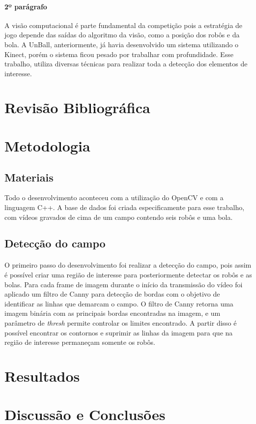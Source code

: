 \documentclass[conference, harvard, brazil, english]{sbatex}
\begin{document}
		\paragraph{2º parágrafo}
		A visão computacional é parte fundamental da competição pois a estratégia de jogo depende das saídas do algoritmo da visão, como a posição dos robôs e da bola. A UnBall, anteriormente, já havia desenvolvido um sistema utilizando o Kinect, porém o sistema ficou pesado por trabalhar com profundidade. Esse trabalho, utiliza diversas técnicas para realizar toda a detecção dos elementos de interesse.
		
	\section{Revisão Bibliográfica}
	
	\section{Metodologia}
		\subsection{Materiais}
		Todo o desenvolvimento aconteceu com a utilização do OpenCV e com a linguagem C++. A base de dados foi criada especificamente para esse trabalho, com vídeos gravados de cima de um campo contendo seis robôs e uma bola.
		\subsection{Detecção do campo}
		\paragraph{}
		O primeiro passo do desenvolvimento foi realizar a detecção do campo, pois assim é possível criar uma região de interesse para posteriormente detectar os robôs e as bolas. Para cada frame de imagem durante o início da transmissão do vídeo foi aplicado um filtro de Canny para detecção de bordas com o objetivo de identificar as linhas que demarcam o campo. O filtro de Canny retorna uma imagem binária com as principais bordas encontradas na imagem, e um parâmetro de \textit{thresh} permite controlar os limites encontrado. A partir disso é possível encontrar os contornos e suprimir as linhas da imagem para que na região de interesse permaneçam somente os robôs.
	\section{Resultados}
			
	\section{Discussão e Conclusões}
	
\end{document}
